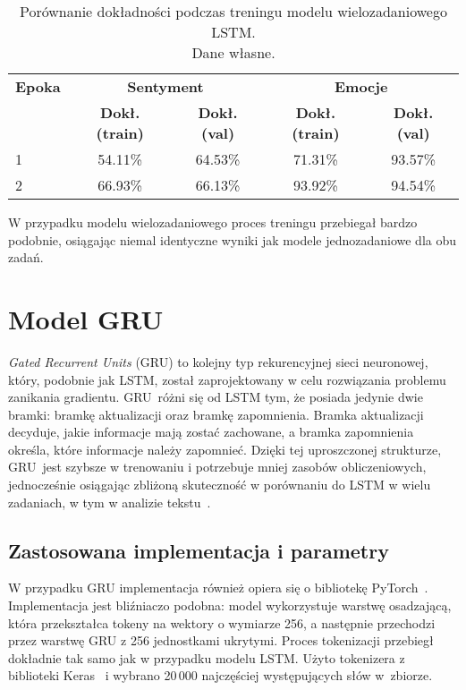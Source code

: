 \begin{table}[H]
\centering
\label{tab:lstm_multi_training_process}
\begin{tabular}{|l|c|c|c|c|}
\hline
\textbf{Epoka} & \multicolumn{2}{c|}{\textbf{Sentyment}} & \multicolumn{2}{c|}{\textbf{Emocje}} \\
\cline{2-5}
& \textbf{Dokł. (train)} & \textbf{Dokł. (val)} & \textbf{Dokł. (train)} & \textbf{Dokł. (val)} \\
\hline
1 & 54.11\% & 64.53\% & 71.31\% & 93.57\% \\
2 & 66.93\% & 66.13\% & 93.92\% & 94.54\% \\
\hline
\end{tabular}
\caption{Porównanie dokładności podczas treningu modelu wielozadaniowego LSTM.\\Dane własne.}
\end{table}

W przypadku modelu wielozadaniowego proces treningu przebiegał bardzo podobnie, osiągając niemal identyczne wyniki jak modele jednozadaniowe dla obu zadań.

\section{Model GRU}
\textit{Gated Recurrent Units} (GRU) to kolejny typ rekurencyjnej sieci neuronowej, który, podobnie jak LSTM, został zaprojektowany w celu rozwiązania problemu zanikania gradientu. GRU~różni się od LSTM tym, że posiada jedynie dwie bramki: bramkę aktualizacji oraz bramkę zapomnienia. Bramka aktualizacji decyduje, jakie informacje mają zostać zachowane, a bramka zapomnienia określa, które informacje należy zapomnieć. Dzięki tej uproszczonej strukturze, GRU~jest szybsze w trenowaniu i potrzebuje mniej zasobów obliczeniowych, jednocześnie osiągając zbliżoną skuteczność w porównaniu do LSTM w wielu zadaniach, w tym w analizie tekstu~\cite{GRUvsLSTM}.

\subsection{Zastosowana implementacja i parametry} 
W przypadku GRU implementacja również opiera się o bibliotekę PyTorch~\cite{PyTorchDocs}. Implementacja jest bliźniaczo podobna: model wykorzystuje warstwę osadzającą, która przekształca tokeny na wektory o wymiarze 256, a następnie przechodzi przez warstwę GRU z 256 jednostkami ukrytymi. Proces tokenizacji przebiegł dokładnie tak samo jak w przypadku modelu LSTM. Użyto tokenizera z biblioteki Keras~\cite{KerasDocs} i wybrano 20\,000 najczęściej występujących słów w~zbiorze.

